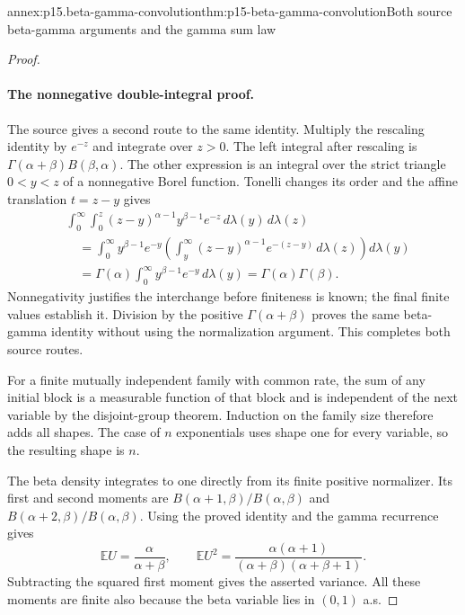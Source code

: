 \begin{annexitem}{annex:p15.beta-gamma-convolution}{thm:p15-beta-gamma-convolution}{Both source beta-gamma arguments and the gamma sum law}
\begin{proof}
\paragraph{The nonnegative double-integral proof.}
The source gives a second route to the same identity. Multiply the
rescaling identity by \(e^{-z}\) and integrate over \(z>0\).
The left integral after rescaling is
\(\Gamma(\alpha+\beta)B(\beta,\alpha)\).
The other expression is an integral over the strict triangle
\(0<y<z\) of a nonnegative Borel function. Tonelli changes its
order and the affine translation \(t=z-y\) gives
\[
 \begin{aligned}
 &\int_0^\infty\int_0^z
      (z-y)^{\alpha-1}y^{\beta-1}e^{-z}\,d\lambda(y)\,d\lambda(z)\\
 &\quad=\int_0^\infty y^{\beta-1}e^{-y}
       \left(\int_y^\infty(z-y)^{\alpha-1}e^{-(z-y)}
                                      \,d\lambda(z)\right)d\lambda(y)\\
 &\quad=\Gamma(\alpha)\int_0^\infty y^{\beta-1}e^{-y}\,d\lambda(y)
       =\Gamma(\alpha)\Gamma(\beta).
 \end{aligned}
\]
Nonnegativity justifies the interchange before finiteness is known;
the final finite values establish it. Division by the positive
\(\Gamma(\alpha+\beta)\) proves the same beta-gamma identity
without using the normalization argument. This completes both
source routes.

For a finite mutually independent family with common rate,
the sum of any initial block is a measurable function of that
block and is independent of the next variable by the disjoint-group
theorem. Induction on the family size therefore adds all shapes.
The case of \(n\) exponentials uses shape one for every variable,
so the resulting shape is \(n\).

The beta density integrates to one directly from its finite positive
normalizer. Its first and second moments are
\(B(\alpha+1,\beta)/B(\alpha,\beta)\) and
\(B(\alpha+2,\beta)/B(\alpha,\beta)\). Using the proved
identity and the gamma recurrence gives
\[
 \mathbb E U=\frac\alpha{\alpha+\beta},\qquad
 \mathbb E U^2=\frac{\alpha(\alpha+1)}
                  {(\alpha+\beta)(\alpha+\beta+1)}.
\]
Subtracting the squared first moment gives the asserted variance.
All these moments are finite also because the beta variable lies
in \((0,1)\) a.s.
\end{proof}
\end{annexitem}

